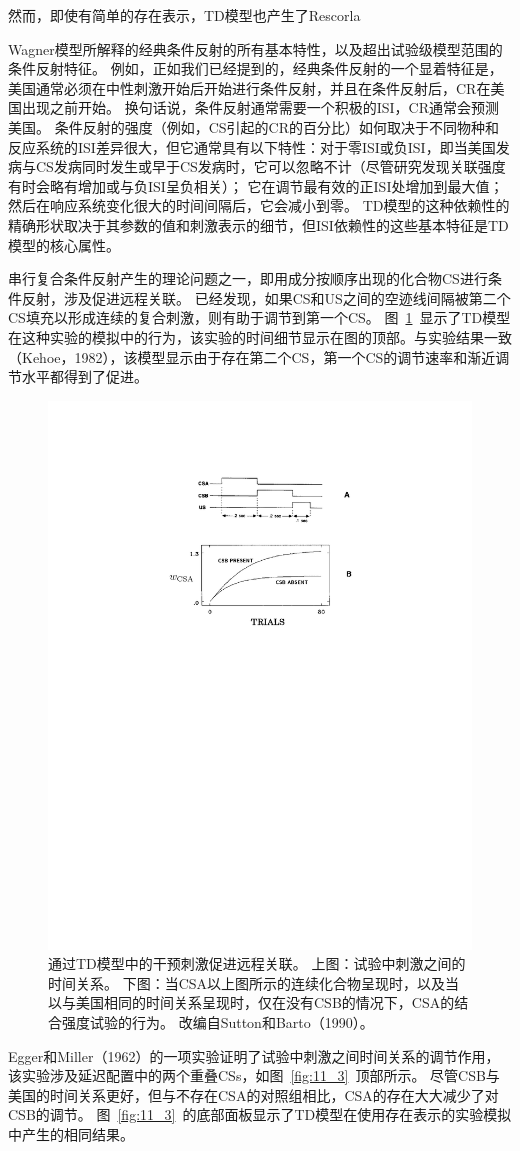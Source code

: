 {{{{{{{{{{{{{{{{{{然而，即使有简单的存在表示，TD模型也产生了Rescorla{Wagner模型所解释的经典条件反射的所有基本特性，以及超出试验级模型范围的条件反射特征。
例如，正如我们已经提到的，经典条件反射的一个显着特征是，美国通常必须在中性刺激开始后开始进行条件反射，并且在条件反射后，CR在美国出现之前开始。
换句话说，条件反射通常需要一个积极的ISI，CR通常会预测美国。
条件反射的强度（例如，CS引起的CR的百分比）如何取决于不同物种和反应系统的ISI差异很大，但它通常具有以下特性：对于零ISI或负ISI，即当美国发病与CS发病同时发生或早于CS发病时，它可以忽略不计（尽管研究发现关联强度有时会略有增加或与负ISI呈负相关）；
它在调节最有效的正ISI处增加到最大值；
然后在响应系统变化很大的时间间隔后，它会减小到零。
TD模型的这种依赖性的精确形状取决于其参数的值和刺激表示的细节，但ISI依赖性的这些基本特征是TD模型的核心属性。


串行复合条件反射产生的理论问题之一，即用成分按顺序出现的化合物CS进行条件反射，涉及促进远程关联。
已经发现，如果CS和US之间的空迹线间隔被第二个CS填充以形成连续的复合刺激，则有助于调节到第一个CS。
图~\ref{fig:11_2}~显示了TD模型在这种实验的模拟中的行为，该实验的时间细节显示在图的顶部。与实验结果一致（Kehoe，1982），该模型显示由于存在第二个CS，第一个CS的调节速率和渐近调节水平都得到了促进。

\begin{figure}[!htb]
	\centering
	\includegraphics[width=0.5\linewidth]{chap11/fig_11_2}
	\caption{通过TD模型中的干预刺激促进远程关联。
		上图：试验中刺激之间的时间关系。
		下图：当CSA以上图所示的连续化合物呈现时，以及当以与美国相同的时间关系呈现时，仅在没有CSB的情况下，CSA的结合强度试验的行为。
		改编自Sutton和Barto（1990）。  \label{fig:11_2}}
\end{figure}


Egger和Miller（1962）的一项实验证明了试验中刺激之间时间关系的调节作用，该实验涉及延迟配置中的两个重叠CSs，如图~\ref{fig:11_3}~顶部所示。
尽管CSB与美国的时间关系更好，但与不存在CSA的对照组相比，CSA的存在大大减少了对CSB的调节。
图~\ref{fig:11_3}~的底部面板显示了TD模型在使用存在表示的实验模拟中产生的相同结果。

}}}}}}}}}}}}}}}}}}}
